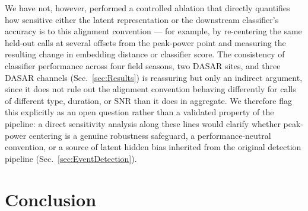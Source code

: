 \documentclass[preprint,NumberedRefs]{JASAnew}
\begin{document}
We have not, however, performed a controlled ablation that directly
quantifies how sensitive either the latent representation or the downstream
classifier's accuracy is to this alignment convention — for example, by
re-centering the same held-out calls at several offsets from the peak-power
point and measuring the resulting change in embedding distance or classifier
score. The consistency of classifier performance across four field seasons,
two DASAR sites, and three DASAR channels (Sec.~\ref{sec:Results}) is
reassuring but only an indirect argument, since it does not rule out the
alignment convention behaving differently for calls of different type,
duration, or SNR than it does in aggregate. We therefore flag this
explicitly as an open question rather than a validated property of the
pipeline: a direct sensitivity analysis along these lines would clarify
whether peak-power centering is a genuine robustness safeguard, a
performance-neutral convention, or a source of latent hidden bias inherited
from the original detection pipeline (Sec.~\ref{sec:EventDetection}).

\section{\label{sec:Conclusion}Conclusion}
\end{document}
